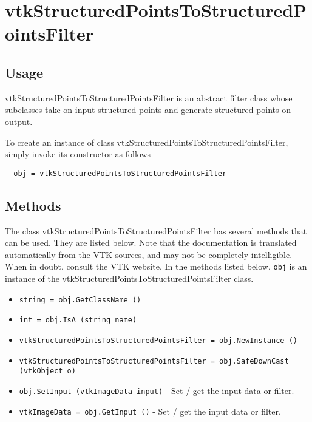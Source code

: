 \section{vtkStructuredPointsToStructuredPointsFilter}

\subsection{Usage}

 vtkStructuredPointsToStructuredPointsFilter is an abstract filter class 
 whose subclasses take on input structured points and generate
 structured points on output.

To create an instance of class vtkStructuredPointsToStructuredPointsFilter, simply
invoke its constructor as follows
\begin{verbatim}
  obj = vtkStructuredPointsToStructuredPointsFilter
\end{verbatim}
\subsection{Methods}

The class vtkStructuredPointsToStructuredPointsFilter has several methods that can be used.
  They are listed below.
Note that the documentation is translated automatically from the VTK sources,
and may not be completely intelligible.  When in doubt, consult the VTK website.
In the methods listed below, \verb|obj| is an instance of the vtkStructuredPointsToStructuredPointsFilter class.
\begin{itemize}
\item  \verb|string = obj.GetClassName ()|

\item  \verb|int = obj.IsA (string name)|

\item  \verb|vtkStructuredPointsToStructuredPointsFilter = obj.NewInstance ()|

\item  \verb|vtkStructuredPointsToStructuredPointsFilter = obj.SafeDownCast (vtkObject o)|

\item  \verb|obj.SetInput (vtkImageData input)| -  Set / get the input data or filter.

\item  \verb|vtkImageData = obj.GetInput ()| -  Set / get the input data or filter.

\end{itemize}
